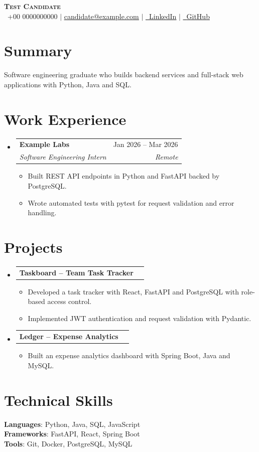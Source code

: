\documentclass[letterpaper,11pt]{article}
\makeatletter
\newcommand{\resumeItem}[1]{
  \item\small{
    {#1 \vspace{-2pt}}
  }
}
\newcommand{\resumeSubheading}[4]{
  \vspace{-2pt}\item
    \begin{tabular*}{0.97\textwidth}[t]{l@{\extracolsep{\fill}}r}
      \textbf{#1} & #2 \\
      \textit{\small#3} & \textit{\small #4} \\
    \end{tabular*}\vspace{-7pt}
}
\newcommand{\resumeProjectHeading}[2]{
    \item
    \begin{tabular*}{0.97\textwidth}{l@{\extracolsep{\fill}}r}
      \small#1 & #2 \\
    \end{tabular*}\vspace{-7pt}
}
\newcommand{\resumeSubHeadingListStart}{\begin{itemize}[leftmargin=0.15in, label={}]}
\newcommand{\resumeSubHeadingListEnd}{\end{itemize}}
\newcommand{\resumeItemListStart}{\begin{itemize}}
\newcommand{\resumeItemListEnd}{\end{itemize}\vspace{-5pt}}
\makeatother
\begin{document}
\begin{center}
    \textbf{\Huge \scshape Test Candidate} \\ \vspace{1pt}
    \small \faPhone\ +00 0000000000 $|$ \href{mailto:candidate@example.com}{\underline{candidate@example.com}} $|$
    \href{https://linkedin.com/in/example}{\faLinkedin\ \underline{LinkedIn}} $|$
    \href{https://github.com/example}{\faGithub\ \underline{GitHub}}
\end{center}

\section{Summary}
Software engineering graduate who builds backend services and full-stack web applications with Python, Java and SQL.

\section{Work Experience}
  \resumeSubHeadingListStart
    \resumeSubheading
      {Example Labs}{Jan 2026 -- Mar 2026}
      {Software Engineering Intern}{Remote}
      \resumeItemListStart
        \resumeItem{Built REST API endpoints in Python and FastAPI backed by PostgreSQL.}
        \resumeItem{Wrote automated tests with pytest for request validation and error handling.}
      \resumeItemListEnd
  \resumeSubHeadingListEnd

\section{Projects}
    \resumeSubHeadingListStart
      \resumeProjectHeading
          {\textbf{Taskboard -- Team Task Tracker} \href{https://github.com/example/taskboard}{\faGithub}}{}
          \resumeItemListStart
            \resumeItem{Developed a task tracker with React, FastAPI and PostgreSQL with role-based access control.}
            \resumeItem{Implemented JWT authentication and request validation with Pydantic.}
          \resumeItemListEnd
      \resumeProjectHeading
          {\textbf{Ledger -- Expense Analytics} \href{https://github.com/example/ledger}{\faGithub}}{}
          \resumeItemListStart
            \resumeItem{Built an expense analytics dashboard with Spring Boot, Java and MySQL.}
          \resumeItemListEnd
    \resumeSubHeadingListEnd

\section{Technical Skills}
 \begin{itemize}[leftmargin=0.15in, label={}]
    \small{\item{
     \textbf{Languages}{: Python, Java, SQL, JavaScript} \\
     \textbf{Frameworks}{: FastAPI, React, Spring Boot} \\
     \textbf{Tools}{: Git, Docker, PostgreSQL, MySQL}
    }}
 \end{itemize}
\end{document}
